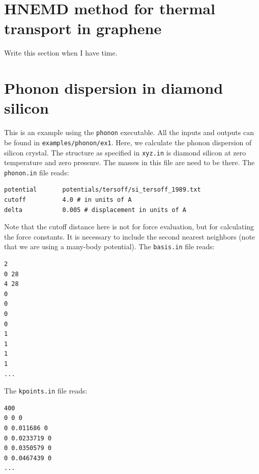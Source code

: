 \documentclass[12pt,a4paper]{report}
\begin{document}
\section{HNEMD method for thermal transport in graphene}

Write this section when I have time.

\section{Phonon dispersion in diamond silicon}

This is an example using the \verb"phonon" executable. All the inputs and outputs can be found in \verb"examples/phonon/ex1". Here, we calculate the phonon dispersion of silicon crystal. The structure as specified in \verb"xyz.in" is diamond silicon at zero temperature and zero pressure.  The masses in this file are need to be there.
The \verb"phonon.in" file reads:
\begin{verbatim}
potential       potentials/tersoff/si_tersoff_1989.txt
cutoff          4.0 # in units of A
delta           0.005 # displacement in units of A
\end{verbatim}
Note that the cutoff distance here is not for force evaluation, but for calculating the force constants. It is necessary to include the second nearest neighbors (note that we are using a many-body potential). The \verb"basis.in" file reads:
\begin{verbatim}
2
0 28
4 28
0
0
0
0
1
1
1
1
...
\end{verbatim}
The \verb"kpoints.in" file reads:
\begin{verbatim}
400
0 0 0
0 0.011686 0
0 0.0233719 0
0 0.0350579 0
0 0.0467439 0
...
\end{verbatim}




\end{document}

